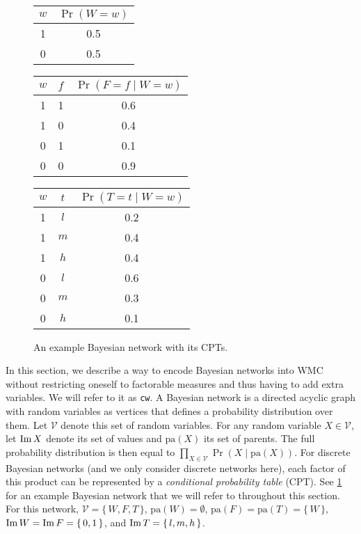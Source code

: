 \begin{figure}[t]
  \centering
    \\
    \begin{tabular}[t]{cc}
      \toprule
      $w$ & $\Pr(W = w)$ \\
      \midrule
      1 & 0.5 \\
      0 & 0.5 \\
      \bottomrule
    \end{tabular}
    \begin{tabular}[t]{ccc}
      \toprule
      $w$ & $f$ & $\Pr(F = f \mid W = w)$ \\
      \midrule
      1 & 1 & 0.6 \\
      1 & 0 & 0.4 \\
      0 & 1 & 0.1 \\
      0 & 0 & 0.9 \\
      \bottomrule
    \end{tabular}
    \begin{tabular}[t]{ccc}
      \toprule
      $w$ & $t$ & $\Pr(T = t \mid W = w)$ \\
      \midrule
      1 & $l$ & 0.2 \\
      1 & $m$ & 0.4 \\
      1 & $h$ & 0.4 \\
      0 & $l$ & 0.6 \\
      0 & $m$ & 0.3 \\
      0 & $h$ & 0.1 \\
      \bottomrule
    \end{tabular}
  \caption{An example Bayesian network with its CPTs.}\label{fig:example_bn}
\end{figure}

In this section, we describe a way to encode Bayesian networks into WMC without
restricting oneself to factorable measures and thus having to add extra
variables. We will refer to it as \texttt{cw}. A Bayesian network is a directed
acyclic graph with random variables as vertices that defines a probability
distribution over them. Let $\mathcal{V}$ denote this set of random variables.
For any random variable $X \in \mathcal{V}$, let $\operatorname{Im} X$ denote its set of
values and $\mathrm{pa}(X)$ its set of parents. The full probability
distribution is then equal to
$\prod_{X \in \mathcal{V}} \Pr(X \mid \mathrm{pa}(X))$. For discrete Bayesian
networks (and we only consider discrete networks here), each factor of this
product can be represented by a \emph{conditional probability table} (CPT). See
\cref{fig:example_bn} for an example Bayesian network that we will refer to
throughout this section. For this network, $\mathcal{V} = \{\, W, F, T \,\}$,
$\mathrm{pa}(W) = \emptyset$, $\mathrm{pa}(F) = \mathrm{pa}(T) = \{\, W \,\}$,
$\operatorname{Im} W = \operatorname{Im} F = \{\, 0, 1 \,\}$, and $\operatorname{Im} T = \{\, l, m, h \,\}$.

